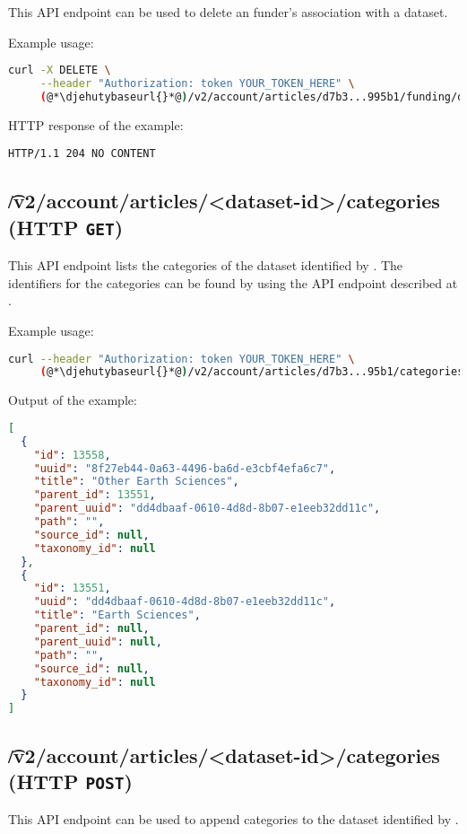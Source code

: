   This API endpoint can be used to delete an funder's association with a dataset.

  Example usage:
\begin{lstlisting}[language=bash]
curl -X DELETE \
     --header "Authorization: token YOUR_TOKEN_HERE" \
     (@*\djehutybaseurl{}*@)/v2/account/articles/d7b3...995b1/funding/d50e...7500
\end{lstlisting}

  HTTP response of the example:
\begin{lstlisting}
HTTP/1.1 204 NO CONTENT
\end{lstlisting}

\subsection{\t{/v2/account/articles/<dataset-id>/categories} (HTTP \texttt{GET})}

  This API endpoint lists the categories of the dataset identified by .
  The identifiers for the categories can be found by using the API endpoint
  described at \refer{sec:v2-categories}.

  Example usage:
\begin{lstlisting}[language=bash]
curl --header "Authorization: token YOUR_TOKEN_HERE" \
     (@*\djehutybaseurl{}*@)/v2/account/articles/d7b3...95b1/categories | jq
\end{lstlisting}

  Output of the example:
\begin{lstlisting}[language=JSON]
[
  {
    "id": 13558,
    "uuid": "8f27eb44-0a63-4496-ba6d-e3cbf4efa6c7",
    "title": "Other Earth Sciences",
    "parent_id": 13551,
    "parent_uuid": "dd4dbaaf-0610-4d8d-8b07-e1eeb32dd11c",
    "path": "",
    "source_id": null,
    "taxonomy_id": null
  },
  {
    "id": 13551,
    "uuid": "dd4dbaaf-0610-4d8d-8b07-e1eeb32dd11c",
    "title": "Earth Sciences",
    "parent_id": null,
    "parent_uuid": null,
    "path": "",
    "source_id": null,
    "taxonomy_id": null
  }
]
\end{lstlisting}

\subsection{\t{/v2/account/articles/<dataset-id>/categories} (HTTP \texttt{POST})}
\label{sec:api-v2-articles-categories-post}

  This API endpoint can be used to append categories to the dataset identified
  by \code{dataset-id}.

